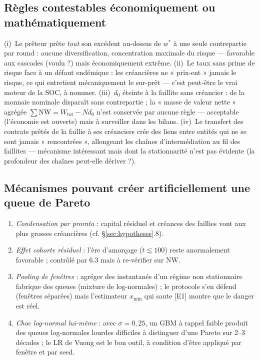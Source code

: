 \documentclass[11pt,a4paper]{article}
\newcommand{\NW}{\mathrm{NW}}
\begin{document}
\subsection{Règles contestables économiquement ou mathématiquement}
(i)~Le prêteur prête \emph{tout} son excédent au-dessus de $w^*$ à une seule
contrepartie par round : aucune diversification, concentration maximale du
risque — favorable aux cascades (voulu ?) mais économiquement extrême.
(ii)~Le taux sans prime de risque face à un défaut endémique : les
créancières ne « prix-ent » jamais le risque, ce qui entretient
mécaniquement le sur-prêt — c'est peut-être le vrai moteur de la SOC, à
nommer. (iii)~$d_0$ éteinte à la faillite sans créancier : de la monnaie
nominale disparaît sans contrepartie ; la « masse de valeur nette » agrégée
$\sum \NW = W_{\mathrm{tot}} - N d_0$ n'est conservée par aucune règle —
acceptable (l'économie est ouverte) mais à surveiller dans les bilans.
(iv)~Le transfert des contrats prêtés de la faillie à ses créanciers crée
des liens entre entités qui ne se sont jamais « rencontrées », allongeant
les chaînes d'intermédiation au fil des faillites — mécanisme intéressant
mais dont la stationnarité n'est pas évidente (la profondeur des chaînes
peut-elle dériver ?).

\subsection{Mécanismes pouvant créer artificiellement une queue de Pareto}
\begin{enumerate}[nosep]
\item \emph{Condensation par prorata} : capital résiduel et créances des
  faillies vont aux plus grosses créancières (cf. \S\ref{sec:hypotheses}.8).
\item \emph{Effet cohorte résiduel} : l'ère d'amorçage ($t \lesssim 100$)
  reste anormalement favorable ; contrôlé par 6.3 mais à re-vérifier sur
  $\NW$.
\item \emph{Pooling de fenêtres} : agréger des instantanés d'un régime non
  stationnaire fabrique des queues (mixture de log-normales) ; le protocole
  s'en défend (fenêtres séparées) mais l'estimateur $x_{\min}$ qui saute
  [E1] montre que le danger est réel.
\item \emph{Choc log-normal lui-même} : avec $\sigma = 0{,}25$, un GBM à
  rappel faible produit des queues log-normales lourdes difficiles à
  distinguer d'une Pareto sur 2--3 décades ; le LR de Vuong est le bon
  outil, à condition d'être appliqué par fenêtre et par seed.
\end{enumerate}
\end{document}
